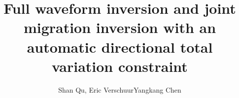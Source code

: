 
\title{Full waveform inversion and joint migration inversion with an automatic directional total variation constraint}

\renewcommand{\thefootnote}{\fnsymbol{footnote}} 


\author{Shan Qu\footnotemark[1], Eric Verschuur\footnotemark[1] Yangkang Chen\footnotemark[2]}
\address{
\footnotemark[1] Delft University of Technology, Delphi consortium, \\
Mekelweg 5, 2628 CD Delft, Netherlands \\
\footnotemark[2] School of Earth Sciences, \\
Zhejiang University\\
 Hangzhou, Zhejiang Province, 310027
}


\maketitle

